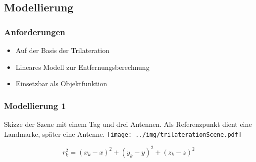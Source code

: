 \subsection{Modellierung}
\begin{frame}
  \frametitle{Anforderungen}
%
\begin{itemize} 
  \pause 
  \item Auf der Basis der Trilateration
  \item Lineares Modell zur Entfernungsberechnung
  \item Einsetzbar als Objektfunktion
\end{itemize} 
	
%
\end{frame}
\begin{frame}
  \frametitle{Modellierung  1}
%
  \begin{center}
	\tiny Skizze der Szene mit einem Tag und drei Antennen. Als Referenzpunkt dient eine Landmarke, später eine Antenne.
%
  	\texttt{[image: ../img/trilaterationScene.pdf]}
  \end{center}
\[
r_k^2= (x_k-x)^2 + (y_k-y)^2 + (z_k-z)^2
\]
\end{frame}
